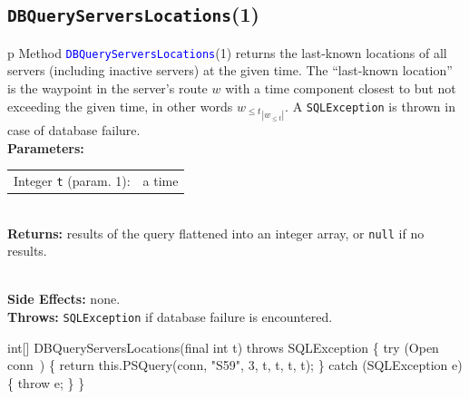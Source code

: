 \subsection{\texttt{DBQueryServersLocations}(1)}
\begin{tabular}{p{\textwidth}}
\toprule
{}
Method \textcolor{blue}{{\tt{}\protect{}DBQueryServersLocations}}(1) returns the
last-known locations of all servers (including inactive servers) at the given
time. The ``last-known location'' is the waypoint in the server's route $w$
with a time component closest to but not exceeding the given time, in other
words ${w_{\leq t}}_{|w_{\leq t}|}$.
A {\tt{}SQLException} is thrown in case of database failure.\\
\midrule
\textbf{Parameters:} \\
\begin{tabular}{lp{116mm}}
Integer {\tt{}t} (param. 1):&a time
\end{tabular}\\
\textbf{Returns:} results of the query flattened into an integer array, or
{\tt{}null} if no results.

\\
\textbf{Side Effects:} none.\\
\textbf{Throws:} {\tt{}SQLException} if database failure is encountered.\\
\bottomrule
\end{tabular}
\nwenddocs{}\endmoddef{}
int[] DBQueryServersLocations(final int t) throws SQLException \{
  try (\LA{}Open \code{}conn\edoc{}~{\nwtagstyle{}}\RA{}) \{
    return this.PSQuery(conn, "S59", 3, t, t, t, t);
  \} catch (SQLException e) \{
    throw e;
  \}
\}
\eatline
{}\nwendcode{}\nwdocspar
